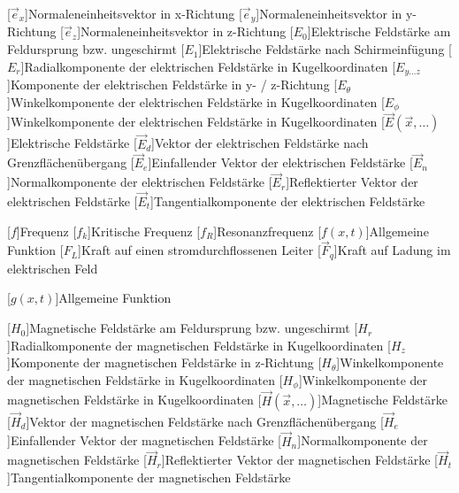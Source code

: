 \begin{acronym}[Platzhalterwort]
[$\vec e_x$]{Normaleneinheitsvektor in x-Richtung}
[$\vec e_y$]{Normaleneinheitsvektor in y-Richtung}
[$\vec e_z$]{Normaleneinheitsvektor in z-Richtung}
[$E_0$]{\acrounit{\volt\per\meter}Elektrische Feldstärke am Feldursprung bzw. ungeschirmt}
[$E_1$]{\acrounit{\volt\per\meter}Elektrische Feldstärke nach Schirmeinfügung}
[$E_r$]{\acrounit{\volt\per\meter}Radialkomponente der elektrischen Feldstärke in Kugelkoordinaten}
[$E_{y\ldots z}$]{\acrounit{\volt\per\meter}Komponente der elektrischen Feldstärke in y- / z-Richtung}
[$E_{\theta}$]{\acrounit{\volt\per\meter}Winkelkomponente der elektrischen Feldstärke in Kugelkoordinaten}
[$E_{\phi}$]{\acrounit{\volt\per\meter}Winkelkomponente der elektrischen Feldstärke in Kugelkoordinaten}
[$\vec E(\vec x, \ldots)$]{\acrounit{\volt\per\meter}Elektrische Feldstärke}
[$\vec E_d$]{\acrounit{\volt\per\meter}Vektor der elektrischen Feldstärke nach Grenzflächenübergang}
[$\vec E_e$]{\acrounit{\volt\per\meter}Einfallender Vektor der elektrischen Feldstärke}
[$\vec E_n$]{\acrounit{\volt\per\meter}Normalkomponente der elektrischen Feldstärke}
[$\vec E_r$]{\acrounit{\volt\per\meter}Reflektierter Vektor der elektrischen Feldstärke}
[$\vec E_t$]{\acrounit{\volt\per\meter}Tangentialkomponente der elektrischen Feldstärke}


[$f$]{\acrounit{\hertz}Frequenz}
[$f_k$]{\acrounit{\hertz}Kritische Frequenz}
[$f_R$]{\acrounit{\hertz}Resonanzfrequenz}
[$f(x,t)$]{\acrounit{-}Allgemeine Funktion}
[$F_L$]{\acrounit{\newton}Kraft auf einen stromdurchflossenen Leiter}
[$\vec F_q$]{\acrounit{\newton}Kraft auf Ladung im elektrischen Feld}

[$g(x,t)$]{\acrounit{-}Allgemeine Funktion}

[$H_0$]{\acrounit{\ampere\per\meter}Magnetische Feldstärke am Feldursprung bzw. ungeschirmt}
[$H_r$]{\acrounit{\ampere\per\meter}Radialkomponente der magnetischen Feldstärke in Kugelkoordinaten}
[$H_z$]{\acrounit{\ampere\per\meter}Komponente der magnetischen Feldstärke in z-Richtung}
[$H_{\theta}$]{\acrounit{\ampere\per\meter}Winkelkomponente der magnetischen Feldstärke in Kugelkoordinaten}
[$H_{\phi}$]{\acrounit{\ampere\per\meter}Winkelkomponente der magnetischen Feldstärke in Kugelkoordinaten}
[$\vec H(\vec x, \ldots)$]{\acrounit{\ampere\per\meter}Magnetische Feldstärke}
[$\vec H_d$]{\acrounit{\ampere\per\meter}Vektor der magnetischen Feldstärke nach Grenzflächenübergang}
[$\vec H_e$]{\acrounit{\ampere\per\meter}Einfallender Vektor der magnetischen Feldstärke}
[$\vec H_n$]{\acrounit{\ampere\per\meter}Normalkomponente der magnetischen Feldstärke}
[$\vec H_r$]{\acrounit{\ampere\per\meter}Reflektierter Vektor der magnetischen Feldstärke}
[$\vec H_t$]{\acrounit{\ampere\per\meter}Tangentialkomponente der magnetischen Feldstärke}



\end{acronym}
